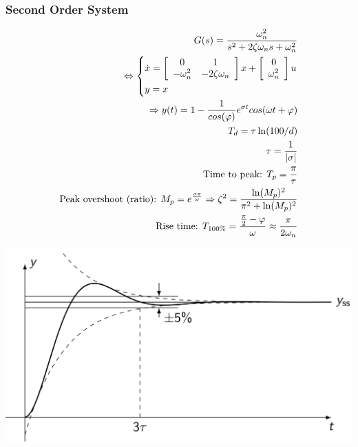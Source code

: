     \subsubsection{Second Order System}
        \begin{align*}
            G(s) = \frac{\omega_n^2}{s^2 + 2 \zeta \omega_n s + \omega_n^2}\\
            \Leftrightarrow 
            \begin{cases*}
                \dot{x} = 
                    \left[\begin{array}{c c}
                        0 & 1\\
                        -\omega_n^2 & -2 \zeta \omega_n
                    \end{array}\right]
                    x + 
                    \left[\begin{array}{c}
                        0\\
                        \omega_n^2
                    \end{array}\right] u\\
                y = x
            \end{cases*}\\
            \Rightarrow y(t) = 1 - \frac{1}{cos(\varphi)}e^{\sigma t} cos(\omega t + \varphi)\\
            T_d = \tau \ln(100/d)\\
            \tau = \frac{1}{|\sigma|}\\
            \text{Time to peak: } T_p = \frac{\pi}{\tau}\\
            \text{Peak overshoot (ratio): } M_p = e^{\frac{\sigma \pi}{\omega}} \Rightarrow \zeta^2 = \frac{\ln(M_p)^2}{\pi^2 + \ln(M_p)^2}\\
            \text{Rise time: } T_{100 \%} = \frac{\frac{\pi}{2} - \varphi}{\omega} \approx \frac{\pi}{2 \omega_n}
        \end{align*}
        
        \includegraphics[width = \linewidth]{src/images/second_order_step_response.png}

